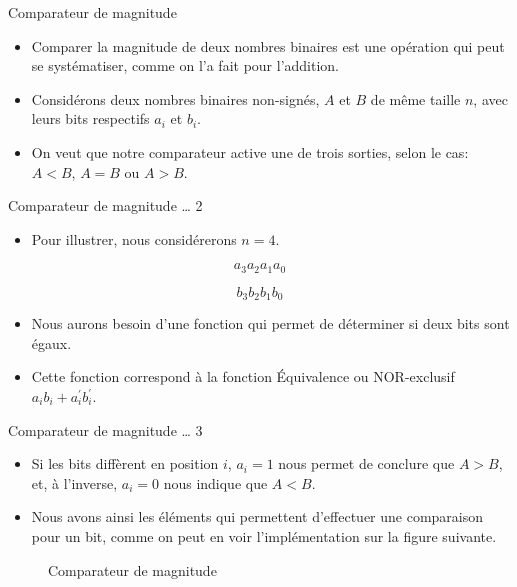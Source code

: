 \documentclass[presentation]{beamer}
\begin{document}
\begin{frame}[label={sec:org8a4a955}]{Comparateur de magnitude}
\begin{itemize}
\item Comparer la magnitude de deux nombres binaires est une opération qui peut se systématiser, comme on l'a fait pour l'addition.

\item Considérons deux nombres binaires non-signés, \(A\) et \(B\) de même taille \(n\), avec leurs bits respectifs \(a_i\) et \(b_i\).

\item On veut que notre comparateur active une de trois sorties, selon le cas: \(A < B\), \(A = B\) ou \(A > B\).
\end{itemize}
\end{frame}

\begin{frame}[label={sec:org419cd8f}]{Comparateur de magnitude \ldots{} 2}
\begin{itemize}
\item Pour illustrer, nous considérerons \(n = 4\).
\end{itemize}

$$ a_3 a_2 a_1 a_0 $$

$$ b_3 b_2 b_1 b_0 $$

\begin{itemize}
\item Nous aurons besoin d'une fonction qui permet de déterminer si deux bits sont égaux.

\item Cette fonction correspond à la fonction \alert{Équivalence} ou NOR-exclusif \(a_i b_i + a_i^\prime b_i^\prime\).
\end{itemize}
\end{frame}


\begin{frame}[label={sec:orgc300977}]{Comparateur de magnitude \ldots{} 3}
\begin{itemize}
\item Si les bits diffèrent en position \(i\), \(a_i = 1\) nous permet de conclure que \(A > B\), et, à l'inverse, \(a_i = 0\) nous indique que \(A < B\).

\item Nous avons ainsi les éléments qui permettent d'effectuer une comparaison pour un bit, comme on peut en voir l'implémentation sur la figure suivante.
\end{itemize}

\begin{figure}[htbp]
\centering

\caption{\label{fig:org1c2afa7}Comparateur de magnitude}
\end{figure}
\end{frame}
\end{document}
